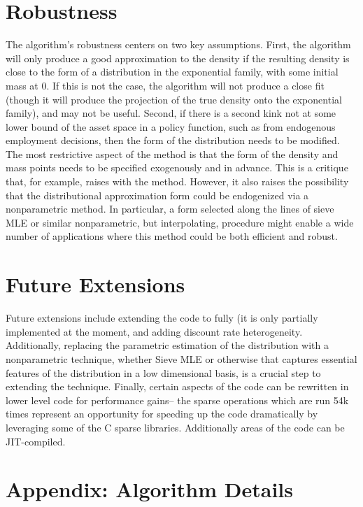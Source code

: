 \documentclass[11pt]{article}
\begin{document}
\section{Robustness} 
The algorithm's robustness centers on two key assumptions. First, the algorithm will only produce a good approximation to the density if the resulting density is close to the form of a distribution in the exponential family, with some initial mass at 0. If this is not the case, the algorithm will not produce a close fit (though it will produce the projection of the true density onto the exponential family), and may not be useful. Second, if there is a second kink not at some lower bound of the asset space in a policy function, such as from endogenous employment decisions, then the form of the distribution needs to be modified. The most restrictive aspect of the method is that the form of the density and mass points needs to be specified exogenously and in advance. This is a critique that, for example, \cite{Bayer2020} raises with the method. However, it also raises the possibility that the distributional approximation form could be endogenized via a nonparametric method. In particular, a form selected along the lines of sieve MLE or similar nonparametric, but interpolating, procedure might enable a wide number of applications where this method could be both efficient and robust.
\section{Future Extensions}
Future extensions include extending the code to \cite{Winberry2021} fully (it is only partially implemented at the moment, and adding discount rate heterogeneity. Additionally, replacing the parametric estimation of the distribution with a nonparametric technique, whether Sieve MLE or otherwise that captures essential features of the distribution in a low dimensional basis, is a crucial step to extending the technique. Finally, certain aspects of the code can be rewritten in lower level code for performance gains-- the sparse operations which are run 54k times represent an opportunity for speeding up the code dramatically by leveraging some of the C sparse libraries. Additionally areas of the code can be JIT-compiled. \section{Appendix: Algorithm Details} 
\end{document}
